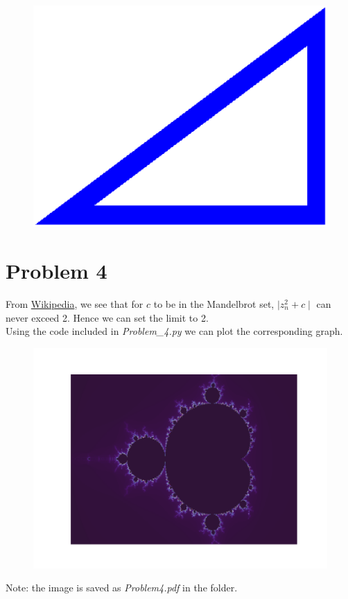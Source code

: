 \documentclass[20pt,letterpaper]{article}
\begin{document}
\begin{figure}[h]
	\includegraphics[scale=0.35]{Problem3}
\end{figure}
\section{Problem 4}
From \href{https://en.wikipedia.org/wiki/Mandelbrot_set}{Wikipedia}, we see that for $c$ to be in the Mandelbrot set, $\mid z_n^2 + c \mid$ can never exceed 2. Hence we can set the limit to 2. \\
Using the code included in \textit{Problem\_4.py} we can plot the corresponding graph. 
\begin{figure}[h]
	\includegraphics[scale=0.75]{Problem4}
\end{figure}
Note: the image is saved as \textit{Problem4.pdf} in the folder.
\end{document}
